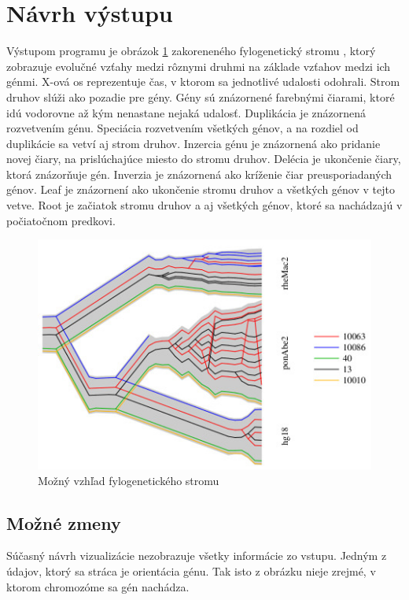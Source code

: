 \section{Návrh výstupu}
Výstupom programu je obrázok \ref{obr:tree} zakoreneného fylogenetický stromu , ktorý zobrazuje evolučné vzťahy medzi rôznymi druhmi na základe vzťahov medzi ich génmi.
X-ová os reprezentuje čas, v ktorom sa jednotlivé udalosti odohrali.
\newline
Strom druhov slúži ako pozadie pre gény.
\newline
Gény sú znázornené farebnými čiarami, ktoré idú vodorovne až kým nenastane nejaká udalosť.
\newline
Duplikácia je znázornená rozvetvením génu. 
\newline
Speciácia rozvetvením všetkých génov, a na rozdiel od duplikácie sa vetví aj strom druhov.
\newline 
Inzercia génu je znázornená ako pridanie novej čiary, na prislúchajúce miesto do stromu druhov.
\newline
Delécia je ukončenie čiary, ktorá znázorňuje gén.
\newline 
Inverzia je znázornená ako kríženie čiar preusporiadaných génov.
\newline 
Leaf je znázornení ako ukončenie stromu druhov a všetkých génov v tejto vetve.
\newline
Root je začiatok stromu druhov a aj všetkých génov, ktoré sa nachádzajú v počiatočnom predkovi.
\begin{figure}
\centerline{\includegraphics[width=1\textwidth]{images/DUP-tube-tree}}
\caption{Možný vzhľad fylogenetického stromu \cite{Vinar2010}}\label{obr:tree}
\end{figure}
\subsection{Možné zmeny}
Súčasný návrh vizualizácie nezobrazuje všetky informácie zo vstupu. Jedným z údajov, 
ktorý sa stráca je orientácia génu.
Tak isto z obrázku nieje zrejmé, v ktorom chromozóme sa gén nachádza.  